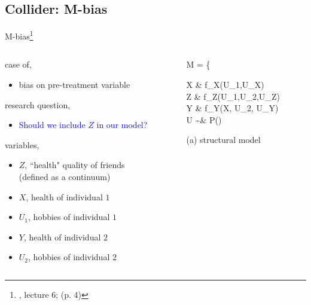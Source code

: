 \subsection{Collider: M-bias}
%
%
\begin{frame}[t, negative]
	\subsectionpage
\end{frame}
%
%
\begin{frame}
	{M-bias\footnote{\citet{McElreath_2022}, lecture 6; \citet{Cinelli_et_al_2021} (p. 4)}}
	\begin{columns}
		\begin{column}{0.5\textwidth}
			case of,
			\begin{itemize}
				\item bias on pre-treatment variable
			\end{itemize}
			
			research question, 
			\begin{itemize}
				\item \textcolor{blue}{Should we include $Z$ in our model?}
			\end{itemize}
			
			variables,
			\begin{itemize}
				\item $Z$, ``health" quality of friends \\
				{\small (defined as a continuum)}
				\item $X$, health of individual $1$
				\item $U_{1}$, hobbies of individual $1$
				\item $Y$, health of individual $2$
				\item $U_{2}$, hobbies of individual $2$ 
			\end{itemize}
		\end{column}
		\begin{column}{0.5\textwidth}  
			\begin{equ}
				M = \left\{ \begin{aligned} 
					X \leftarrow & \; f_{X}(U_{1},U_{X}) \\
					Z \leftarrow & \; f_{Z}(U_{1},U_{2},U_{Z}) \\
					Y \leftarrow & \; f_{Y}(X, U_{2}, U_{Y}) \\
					U \sim & \; P()
				\end{aligned} \right
				\caption*{(a) structural model}
			\end{equ}
			\begin{figure}
\end{figure}
\end{column}
\end{columns}
\end{frame}
